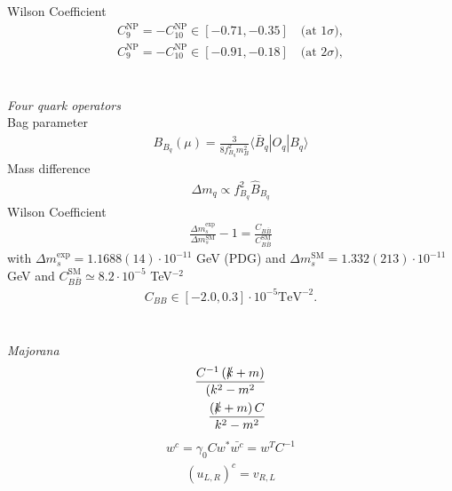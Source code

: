 Wilson Coefficient \cite{150306199}
\begin{align}
 C_9^\text{NP} = -C_{10}^\text{NP} \in [-0.71,-0.35]\quad \text{(at 1}\sigma),\\
 C_9^\text{NP} = -C_{10}^\text{NP} \in [-0.91,-0.18]\quad \text{(at 2}\sigma),
 \label{eq_mumuBound}
\end{align}
\\ \\ \textit{Four quark operators}\\
Bag parameter \cite{1607.00299}
\begin{align}
 B_{B_q}(\mu) = \frac{3}{8f_{B_q}^2 m_B^2} \langle \bar B_q |O_q|B_q \rangle
\end{align}
Mass difference \cite{1102.0009}
\begin{align}
 \Delta m_q \propto f^2_{B_q} \hat{B}_{B_q}
\end{align}
Wilson Coefficient
\begin{align}
 \frac{\Delta m_s^\text{exp}}{\Delta m_s^\text{SM}}-1 = \frac{C_{B\bar B}}{C^\text{SM}_{B\bar B}}
\end{align}
with $\Delta m_s^\text{exp} = 1.1688(14) \cdot 10^{-11}$ GeV (PDG) \cite{1602.03560} and $\Delta m_s^\text{SM} = 1.332(213)\cdot 10^{-11}$ GeV \cite{0612167}%
and $C_{B\bar B}^\text{SM} \simeq 8.2\cdot 10^{-5}$ TeV$^{-2}$ 
\begin{align}
 C_{BB} \in [-2.0,0.3] \cdot 10^{-5} \text{TeV}^{-2}.%
 \label{eq_mixBound}
\end{align}
\\ \\ \textit{Majorana}\\
\begin{equation}
\begin{aligned}
 \frac{C^{-1}\left(\slashed{k}+m\right)}{(k^2-m^2}\\
 \frac{\left(\slashed{k}+m\right)C}{k^2-m^2}
\end{aligned}
\label{eq_majoProp}
\end{equation}
\begin{equation}
\begin{aligned}
 w^c = \gamma_0 C w^*
 \bar {w^c}= w^T C^{-1}
\end{aligned}
\label{eq_ChargeConj}
\end{equation}
\cite{Fierz}
\begin{align}
 \left(u_{L,R}\right)^c = v_{R,L}
\end{align}




